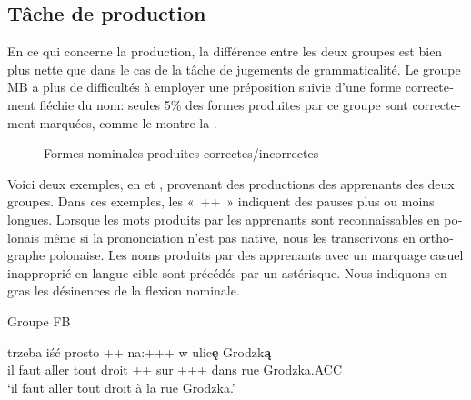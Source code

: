 \documentclass[output=paper]{langscibook}
\begin{document}
\begin{otherlanguage}{french}
\subsection{Tâche de production}\label{sec:watorek:5.2}

En ce qui concerne la production, la différence entre les deux groupes est bien plus nette que dans le cas de la tâche de jugements de grammaticalité. Le groupe MB a plus de difficultés à employer une préposition suivie d’une forme correctement fléchie du nom: seules 5\% des formes produites par ce groupe sont correctement marquées, comme le montre la .

\begin{figure}
\caption{\label{fig:watorek:5} Formes nominales produites correctes/incorrectes}
\end{figure}

\begin{sloppypar}
Voici deux exemples, en  et , provenant des productions des apprenants des deux groupes. Dans ces exemples, les «~++~» indiquent des pauses plus ou moins longues. Lorsque les mots produits par les apprenants sont reconnaissables en polonais même si la prononciation n’est pas native, nous les transcrivons en orthographe polonaise. Les noms produits par des apprenants avec un marquage casuel inapproprié en langue cible sont précédés par un astérisque. Nous indiquons en gras les désinences de la flexion nominale.
\end{sloppypar}

\ea%
    \label{ex:watorek:7}

           Groupe FB

\ea
\gll trzeba   iść   {prosto} {++}  {na:+++ w}   ulic\textbf{ę} Grodzk\textbf{ą} \\
 {il faut} aller   {tout droit} {++}   {sur +++ dans} rue Grodzka.ACC\\
\glt ‘il faut aller tout droit à la rue Grodzka.’


\end{otherlanguage}
\end{document}
